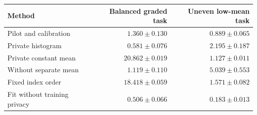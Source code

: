 \begin{tabular}{@{}lrr@{}}
\toprule
Method & Balanced graded task & Uneven low-mean task\\
\midrule
Pilot and calibration & $1.360\pm 0.130$ & $0.889\pm 0.065$\\
Private histogram & $0.581\pm 0.076$ & $2.195\pm 0.187$\\
Private constant mean & $20.862\pm 0.019$ & $1.127\pm 0.011$\\
Without separate mean & $1.119\pm 0.110$ & $5.039\pm 0.553$\\
Fixed index order & $18.418\pm 0.059$ & $1.571\pm 0.082$\\
Fit without training privacy & $0.506\pm 0.066$ & $0.183\pm 0.013$\\
\bottomrule
\end{tabular}
